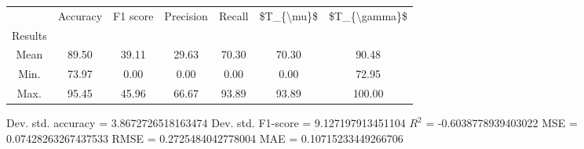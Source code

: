 \begin{tabular}{|c|c|c|c|c|c|c|}
\toprule
{} &  Accuracy &  F1 score &  Precision &  Recall &  \$T\_\{\textbackslash mu\}\$ &  \$T\_\{\textbackslash gamma\}\$ \\
Results &           &           &            &         &            &               \\
\hline
Mean    &     89.50 &     39.11 &      29.63 &   70.30 &      70.30 &         90.48 \\
Min.    &     73.97 &      0.00 &       0.00 &    0.00 &       0.00 &         72.95 \\
Max.    &     95.45 &     45.96 &      66.67 &   93.89 &      93.89 &        100.00 \\
\bottomrule
\end{tabular}

 Dev. std. accuracy = 3.8672726518163474
 Dev. std. F1-score = 9.127197913451104
 $R^2$ = -0.6038778939403022
 MSE = 0.07428263267437533
 RMSE = 0.2725484042778004
 MAE = 0.10715233449266706